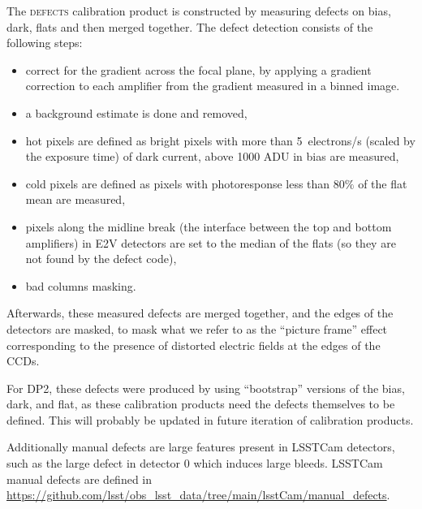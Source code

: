 The \textsc{defects} calibration product is constructed by measuring defects on bias, dark, flats and then merged together.
The defect detection consists of the following steps:
\begin{itemize}
    \item correct for the gradient across the focal plane, by applying a gradient correction to each amplifier
    from the gradient measured in a binned image.
    \item a background estimate is done and removed,
    \item hot pixels are defined as bright pixels with more than 5~electrons/s (scaled by the exposure time) of dark current, above 1000 ADU in bias are measured,
    \item cold pixels are defined as pixels with photoresponse less than $80\%$ of the flat mean are measured,
    \item pixels along the midline break (the interface between the top and bottom amplifiers) in E2V detectors are
    set to the median of the flats (so they are not found by the defect code),
    \item bad columns masking.
\end{itemize}

Afterwards, these measured defects are merged together, and the edges of the detectors are masked, to
mask what we refer to as the ``picture frame'' effect corresponding to the presence of distorted electric fields at the edges of the CCDs.

For DP2, these defects were produced by using ``bootstrap'' versions of the bias, dark, and flat, as these calibration products need the defects themselves to be defined.
This will probably be updated in future iteration of calibration products.

Additionally manual defects are large features present in LSSTCam detectors, such as the large defect in detector 0
which induces large bleeds. LSSTCam manual defects are defined in \url{https://github.com/lsst/obs_lsst_data/tree/main/lsstCam/manual_defects}.

